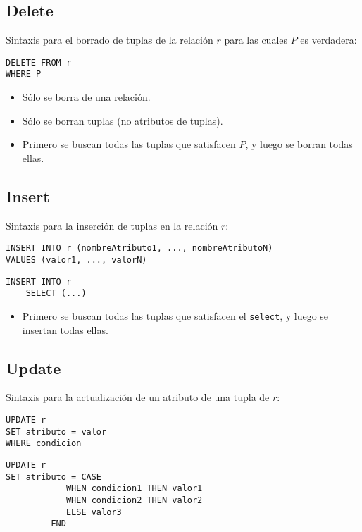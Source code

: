 \documentclass[a4paper, twoside]{article}
\begin{document}
\subsection{Delete}
Sintaxis para el borrado de tuplas de la relación $r$ para las cuales $P$ es verdadera:

\begin{lstlisting}
DELETE FROM r
WHERE P
\end{lstlisting}

\begin{itemize}
	\item Sólo se borra de una relación.
	\item Sólo se borran tuplas (no atributos de tuplas).
	\item Primero se buscan todas las tuplas que satisfacen $P$, y luego se borran todas ellas.
\end{itemize}

\subsection{Insert}
Sintaxis para la inserción de tuplas en la relación $r$:

\begin{lstlisting}
INSERT INTO r (nombreAtributo1, ..., nombreAtributoN)
VALUES (valor1, ..., valorN)
\end{lstlisting}

\begin{lstlisting}
INSERT INTO r 
	SELECT (...)
\end{lstlisting}

\begin{itemize}
\item Primero se buscan todas las tuplas que satisfacen el \texttt{select}, y luego se insertan todas ellas.
\end{itemize}

\subsection{Update}
Sintaxis para la actualización de un atributo de una tupla de $r$:

\begin{lstlisting}
UPDATE r
SET atributo = valor
WHERE condicion
\end{lstlisting}

\begin{lstlisting}
UPDATE r
SET atributo = CASE
			WHEN condicion1 THEN valor1
			WHEN condicion2 THEN valor2
			ELSE valor3
		 END
\end{lstlisting}
\end{document}
